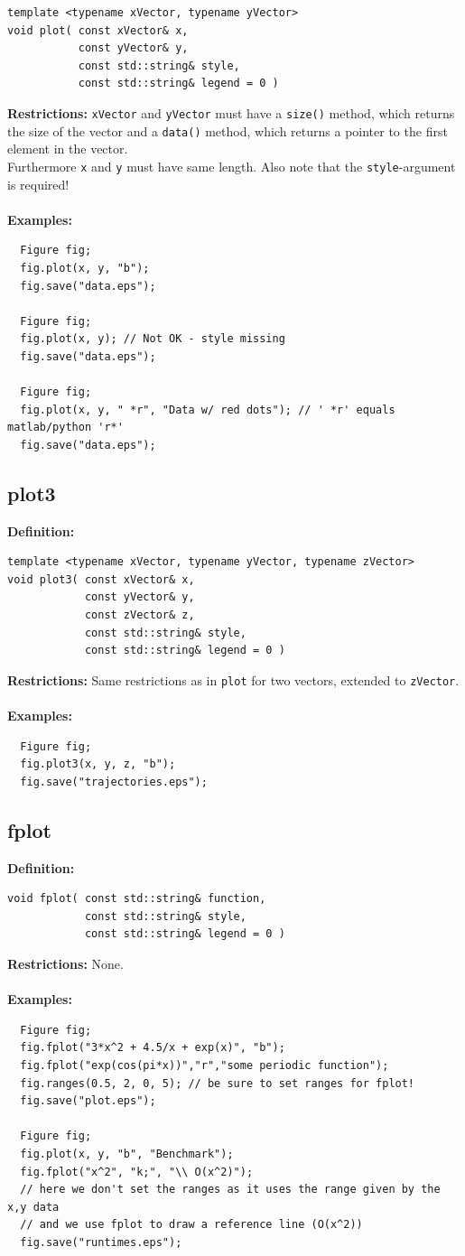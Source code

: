 \documentclass[a4paper]{article}
\newcommand{\command}[1]{\subsection{#1}}
\begin{document}
\begin{lstlisting}
template <typename xVector, typename yVector>
void plot( const xVector& x, 
           const yVector& y, 
           const std::string& style, 
           const std::string& legend = 0 ) 
\end{lstlisting}
\textbf{Restrictions:} \texttt{xVector} and \texttt{yVector} must have a \texttt{size()} method, which returns the size of the vector 
and a \texttt{data()} method, which returns a pointer to the first element in the vector. \\
Furthermore \texttt{x} and \texttt{y} must have same length. Also note that the \texttt{style}-argument is required! \\ \\
%
\textbf{Examples:}
\begin{lstlisting}
  Figure fig;
  fig.plot(x, y, "b");
  fig.save("data.eps");

  Figure fig;
  fig.plot(x, y); // Not OK - style missing
  fig.save("data.eps");

  Figure fig;
  fig.plot(x, y, " *r", "Data w/ red dots"); // ' *r' equals matlab/python 'r*'
  fig.save("data.eps");
\end{lstlisting}

\command{plot3}

\textbf{Definition:}
\begin{lstlisting}
template <typename xVector, typename yVector, typename zVector>
void plot3( const xVector& x,
            const yVector& y,
            const zVector& z,
            const std::string& style,
            const std::string& legend = 0 )
\end{lstlisting}
\textbf{Restrictions:} Same restrictions as in \texttt{plot} for two vectors, extended to \texttt{zVector}. \\ \\
%
\textbf{Examples:}
\begin{lstlisting}
  Figure fig;
  fig.plot3(x, y, z, "b");
  fig.save("trajectories.eps");
\end{lstlisting}


\command{fplot}

\textbf{Definition:}
\begin{lstlisting}
void fplot( const std::string& function,
            const std::string& style,
            const std::string& legend = 0 )
\end{lstlisting}
\textbf{Restrictions:} None. \\ \\
%
\textbf{Examples:}
\begin{lstlisting}
  Figure fig;
  fig.fplot("3*x^2 + 4.5/x + exp(x)", "b");
  fig.fplot("exp(cos(pi*x))","r","some periodic function");
  fig.ranges(0.5, 2, 0, 5); // be sure to set ranges for fplot!
  fig.save("plot.eps");

  Figure fig;
  fig.plot(x, y, "b", "Benchmark");
  fig.fplot("x^2", "k;", "\\ O(x^2)");
  // here we don't set the ranges as it uses the range given by the x,y data
  // and we use fplot to draw a reference line (O(x^2))
  fig.save("runtimes.eps"); 
\end{lstlisting}
\end{document}
